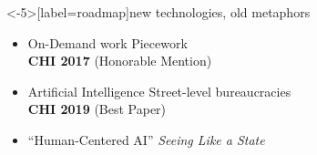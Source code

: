 \documentclass[presentation]{subfiles}
\begin{document}
\begin{frame}<-5>[label=roadmap]{new technologies, old metaphors}

    \begin{itemize}
      \item<1-6,8,10>[] \alert<5>{On-Demand work \hfill Piecework
            \\\hfill{\footnotesize \textsc{\textbf{CHI 2017}}} {\scriptsize(Honorable Mention)}}
      
      \vspace{1em}

      \item<2-4,6-8,10>[] \alert<7>{Artificial Intelligence \hfill Street-level bureaucracies
            \\\hfill{\footnotesize \textsc{\textbf{CHI 2019}}} {\scriptsize(Best Paper)}}

      \vspace{1em}

      \item<3-4,6,8-10>[] \alert<9>{``Human-Centered AI'' \hfill \textit{Seeing Like a State}\\~}


    \end{itemize}

\end{frame}
\end{document}
